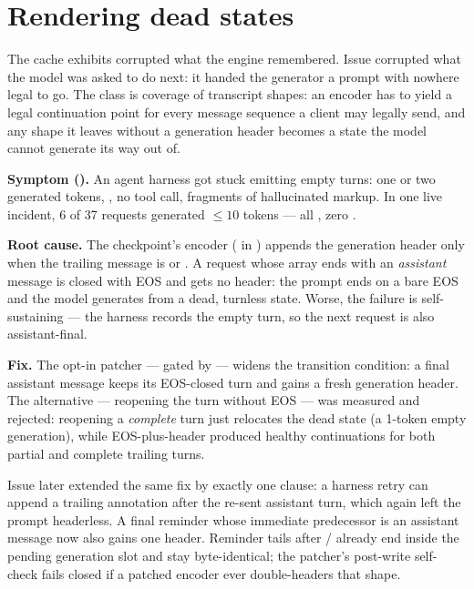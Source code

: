\section{Rendering dead states}
\label{sec:bugs-render}

The cache exhibits corrupted what the engine remembered. Issue 
corrupted what the model was asked to do next: it handed the generator a
prompt with nowhere legal to go. The class is coverage of transcript shapes:
an encoder has to yield a legal continuation point for every message sequence
a client may legally send, and any shape it leaves without a generation
header becomes a state the model cannot generate its way out of.

\textbf{Symptom ().} An agent harness got stuck emitting empty
turns: one or two generated tokens, , no tool
call, fragments of hallucinated markup. In one live incident, 6 of 37 requests
generated ${\leq}10$ tokens --- all , zero .

\textbf{Root cause.} The checkpoint's encoder ( in
) appends the generation header only when
the trailing message is  or . A request whose
 array ends with an \emph{assistant} message is closed with EOS
and gets no header: the prompt ends on a bare EOS and the model generates from
a dead, turnless state. Worse, the failure is self-sustaining --- the harness
records the empty turn, so the next request is also assistant-final.

\textbf{Fix.} The opt-in patcher
 --- gated by
 --- widens the transition condition:
a final assistant message keeps its EOS-closed turn and gains a fresh
generation header. The alternative --- reopening the turn without EOS --- was
measured and rejected: reopening a \emph{complete} turn just relocates the dead
state (a 1-token empty generation), while EOS-plus-header produced healthy
continuations for both partial and complete trailing turns.

Issue 
later extended the same fix by exactly one clause: a harness retry can append a
trailing  annotation after the re-sent assistant turn,
which again left the prompt headerless. A final reminder whose immediate
predecessor is an assistant message now also gains one header. Reminder tails
after / already end inside the pending generation
slot and stay byte-identical; the patcher's post-write self-check fails closed
if a patched encoder ever double-headers that shape.

